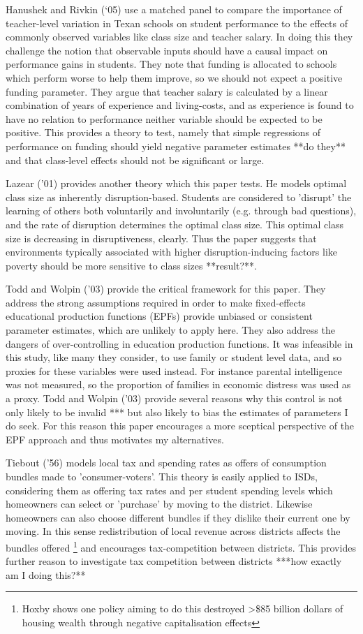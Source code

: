 \documentclass[11pt]{article}
\begin{document}
Hanushek and Rivkin (‘05) use a matched panel to compare the importance of teacher-level variation in Texan schools on student performance to the effects of commonly observed variables like class size and teacher salary. In doing this they challenge the notion that observable inputs should have a causal impact on performance gains in students. They note that funding is allocated to schools which perform worse to help them improve, so we should not expect a positive funding parameter. They argue that teacher salary is calculated by a linear combination of years of experience and living-costs, and as experience is found to have no relation to performance neither variable should be expected to be positive. This provides a theory to test, namely that simple regressions of performance on funding should yield negative parameter estimates **do they** and that class-level effects should not be significant or large. 

Lazear ('01) provides another theory which this paper tests. He models optimal class size as inherently disruption-based. Students are considered to 'disrupt' the learning of others both voluntarily and involuntarily (e.g. through bad questions), and the rate of disruption determines the optimal class size. This optimal class size is decreasing in disruptiveness, clearly. Thus the paper suggests that environments typically associated  with higher disruption-inducing factors like poverty should be more sensitive to class sizes **result?**. 

Todd and Wolpin ('03) provide the critical framework for this paper. They address the strong assumptions required in order to make fixed-effects educational production functions (EPFs) provide unbiased or consistent parameter estimates, which are unlikely to apply here. They also address the dangers of over-controlling in education production functions. It was infeasible in this study, like many they consider, to use family or student level data, and so proxies for these variables were used instead. For instance parental intelligence was not measured, so the proportion of families in economic distress was used as a proxy. Todd and Wolpin ('03) provide several reasons why this control is not only likely to be invalid *** but also likely to bias the estimates of parameters I do seek. For this reason this paper encourages a more sceptical perspective of the EPF approach and thus motivates my alternatives. 

Tiebout ('56) models local tax and spending rates as offers of consumption bundles made to 'consumer-voters'. This theory is easily applied to ISDs, considering them as offering tax rates and per student spending levels which homeowners can select or 'purchase' by moving to the district. Likewise homeowners can also choose different bundles if they dislike their current one by moving. In this sense redistribution of local revenue across districts affects the bundles offered \footnote{Hoxby shows one policy aiming to do this destroyed \textgreater\$85 billion dollars of housing wealth through negative capitalisation effects} and encourages tax-competition between districts. This provides further reason to investigate tax competition between districts ***how exactly am I doing this?**
\end{document}
